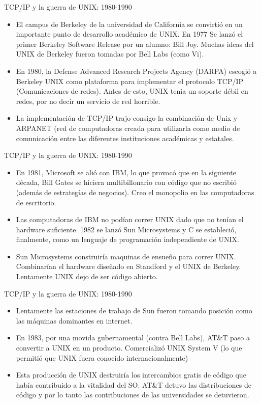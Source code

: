 \documentclass[11pt]{beamer}
\begin{document}
		\begin{frame}{TCP/IP y la guerra de UNIX: 1980-1990}
			\begin{itemize}
				\item El campus de Berkeley de la universidad de California se convirtió en un importante punto de desarrollo académico de UNIX. En 1977 Se lanzó el primer Berkeley Software Release por un alumno: Bill Joy. Muchas ideas del UNIX de Berkeley fueron tomadas por Bell Labs (como Vi).
				\item En 1980, la Defense Advanced Research Projects Agency (DARPA) escogió a Berkeley UNIX como plataforma para implementar el protocolo TCP/IP (Comunicaciones de redes). Antes de esto, UNIX tenia un soporte débil en redes, por no decir un servicio de red horrible.
				\item La implementación de TCP/IP trajo consigo la combinación de Unix y ARPANET (red de computadoras creada para utilizarla como medio de comunicación entre las diferentes instituciones académicas y estatales.
			\end{itemize}
		\end{frame}
		\begin{frame}{TCP/IP y la guerra de UNIX: 1980-1990}
			\begin{itemize}
				\item En 1981, Microsoft se alió con IBM, lo que provocó que en la siguiente década, Bill Gates se hiciera multibillonario con código que no escribió (además de estrategías de negocios). Creo el monopolio en las computadoras de escritorio.
				\item Las computadoras de IBM no podían correr UNIX dado que no tenían el hardware suficiente. 1982 se lanzó Sun Microsystems y C se estableció, finalmente, como un lenguaje de programación independiente de UNIX.
				\item Sun Microsystems construiría maquinas de ensueño para correr UNIX. Combinarían el hardware diseñado en Standford y el UNIX de Berkeley. Lentamente UNIX dejo de ser código abierto.
			\end{itemize}
		\end{frame}
		\begin{frame}{TCP/IP y la guerra de UNIX: 1980-1990}
			\begin{itemize}
				\item Lentamente las estaciones de trabajo de Sun fueron tomando posición como las máquinas dominantes en internet.
				\item En 1983, por una movida gubernamental (contra Bell Labs), AT\&T paso a convertir a UNIX en un producto. Comercializó UNIX System V (lo que permitió que UNIX fuera conocido internacionalmente)
				\item Esta producción de UNIX destruiría los intercambios gratis de código que había contribuido a la vitalidad del SO. AT\&T detuvo las distribuciones de código y por lo tanto las contribuciones de las universidades se detuvieron.
			\end{itemize}
		\end{frame}
\end{document}
